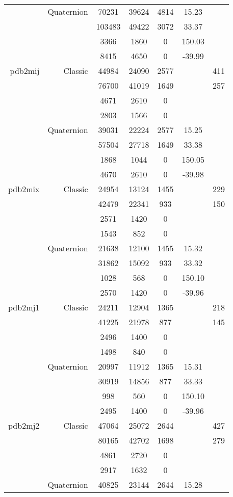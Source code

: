 \begin{xltabular}{\textwidth}{r|rcccSc}
& Quaternion & 70231 & 39624 & 4814 & 15.23 & \\
& & 103483 & 49422 & 3072 & 33.37 & \\
& & 3366 & 1860 & 0 & 150.03 & \\
& & 8415 & 4650 & 0 & -39.99 & \\ \addlinespace
pdb2mij & Classic & 44984 & 24090 & 2577 & & 411 \\
& & 76700 & 41019 & 1649 & & 257 \\
& & 4671 & 2610 & 0 & & \\
& & 2803 & 1566 & 0 & & \\
& Quaternion & 39031 & 22224 & 2577 & 15.25 & \\
& & 57504 & 27718 & 1649 & 33.38 & \\
& & 1868 & 1044 & 0 & 150.05 & \\
& & 4670 & 2610 & 0 & -39.98 & \\ \addlinespace
pdb2mix & Classic & 24954 & 13124 & 1455 & & 229 \\
& & 42479 & 22341 & 933 & & 150 \\
& & 2571 & 1420 & 0 & & \\
& & 1543 & 852 & 0 & & \\
& Quaternion & 21638 & 12100 & 1455 & 15.32 & \\
& & 31862 & 15092 & 933 & 33.32 & \\
& & 1028 & 568 & 0 & 150.10 & \\
& & 2570 & 1420 & 0 & -39.96 & \\ \addlinespace
pdb2mj1 & Classic & 24211 & 12904 & 1365 & & 218 \\
& & 41225 & 21978 & 877 & & 145 \\
& & 2496 & 1400 & 0 & & \\
& & 1498 & 840 & 0 & & \\
& Quaternion & 20997 & 11912 & 1365 & 15.31 & \\
& & 30919 & 14856 & 877 & 33.33 & \\
& & 998 & 560 & 0 & 150.10 & \\
& & 2495 & 1400 & 0 & -39.96 & \\ \addlinespace
pdb2mj2 & Classic & 47064 & 25072 & 2644 & & 427 \\
& & 80165 & 42702 & 1698 & & 279 \\
& & 4861 & 2720 & 0 & & \\
& & 2917 & 1632 & 0 & & \\
& Quaternion & 40825 & 23144 & 2644 & 15.28 & \\

\end{xltabular}

